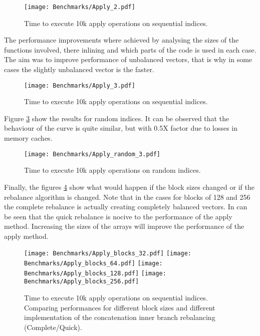 \begin{figure}[h!]
  \centering
  \texttt{[image: Benchmarks/Apply\_2.pdf]}
  \caption{Time to execute 10k apply operations on sequential indices.}
   \label{ApplyBenchmarks2}
\end{figure}

The performance improvements where achieved by analysing the sizes of the functions involved, there inlining and which parts of the code is used in each case. The aim was to improve performance of unbalanced vectors, that is why in some cases the slightly unbalanced vector is the faster.

\begin{figure}[h!]
  \centering
  \texttt{[image: Benchmarks/Apply\_3.pdf]}
  \caption{Time to execute 10k apply operations on sequential indices.}
   \label{ApplyBenchmarks3}
\end{figure}

Figure \ref{ApplyRandomBenchmarks} show the results for random indices. It can be observed that the behaviour of the curve is quite similar, but with 0.5X factor due to losses in memory caches.

\begin{figure}[h!]
  \centering
  \texttt{[image: Benchmarks/Apply\_random\_3.pdf]}
  \caption{Time to execute 10k apply operations on random indices.}
  \label{ApplyRandomBenchmarks}
\end{figure}

Finally, the figures \ref{ApplyBlocksBenchmarks} show what would happen if the block sizes changed or if the rebalance algorithm is changed. Note that in the cases for blocks of 128 and 256 the complete rebalance is actually creating completely balanced vectors. In can be seen that the quick rebalance is nocive to the performance of the apply method. Increasing the sizes of the arrays will improve the performance of the apply method.

\begin{figure}[h!]
  \centering
  \texttt{[image: Benchmarks/Apply\_blocks\_32.pdf]}
  \texttt{[image: Benchmarks/Apply\_blocks\_64.pdf]}
  \texttt{[image: Benchmarks/Apply\_blocks\_128.pdf]}
  \texttt{[image: Benchmarks/Apply\_blocks\_256.pdf]}
   \caption{Time to execute 10k apply operations on sequential indices. Comparing performances for different block sizes and different implementation of the concatenation inner branch rebalancing (Complete/Quick).}
  \label{ApplyBlocksBenchmarks}
\end{figure}

